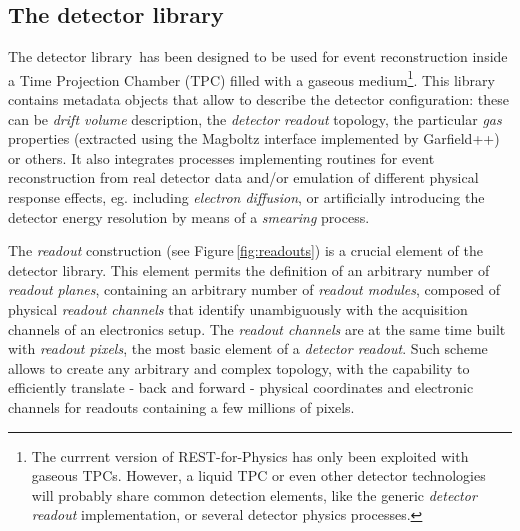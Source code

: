 \subsection{The detector library}

The detector library\,\cite{REST_Detector_Git} has been designed to be used for event reconstruction inside a Time Projection Chamber (TPC) filled with a gaseous medium\footnote{The currrent version of REST-for-Physics has only been exploited with gaseous TPCs. However, a liquid TPC or even other detector technologies will probably share common detection elements, like the generic \emph{detector readout} implementation, or several detector physics processes. }. This library contains metadata objects that allow to describe the detector configuration: these can be \emph{drift volume} description, the \emph{detector readout} topology, the particular \emph{gas} properties (extracted using the Magboltz interface implemented by Garfield++) or others. It also integrates processes implementing routines for event reconstruction from real detector data and/or emulation of different physical response effects, eg. including \emph{electron diffusion}, or artificially introducing the detector energy resolution by means of a \emph{smearing} process.

The \emph{readout} construction (see Figure\,\ref{fig:readouts}) is a crucial element of the detector library. This element permits the definition of an arbitrary number of \emph{readout planes}, containing an arbitrary number of \emph{readout modules}, composed of physical \emph{readout channels} that identify unambiguously with the acquisition channels of an electronics setup. The \emph{readout channels} are at the same time built with \emph{readout pixels}, the most basic element of a \emph{detector readout}. Such scheme allows to create any arbitrary and complex topology, with the capability to efficiently translate - back and forward - physical coordinates and electronic channels for readouts containing a few millions of pixels.

